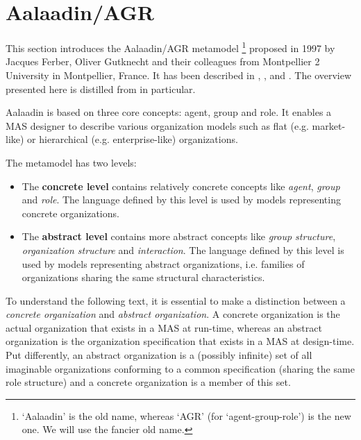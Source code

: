 \section{Aalaadin/AGR}

This section introduces the Aalaadin/AGR metamodel
\footnote{`Aalaadin' is the old name, whereas `AGR' (for `agent-group-role') is the new one. We will use the fancier old name.}
proposed in 1997 by Jacques Ferber, Oliver Gutknecht and their colleagues from Montpellier 2 University in Montpellier, France.
It has been described in \cite{Ferber97}, \cite{Ferber98}, \cite{Ferber00} and \cite{Ferber03}.
The overview presented here is distilled from \cite{Ferber98} in particular.


Aalaadin is based on three core concepts: agent, group and role.
It enables a MAS designer to describe various organization models such as flat (e.g. market-like) or hierarchical (e.g. enterprise-like) organizations.

The metamodel has two levels:
\begin{itemize}
	\item The \textbf{concrete level} contains relatively concrete concepts like \textit{agent}, \textit{group} and \textit{role}.
	The language defined by this level is used by models representing concrete organizations.
	\item The \textbf{abstract level} contains more abstract concepts like \textit{group structure}, \textit{organization structure} and \textit{interaction}. 
	The language defined by this level is used by models representing abstract organizations, i.e. families of organizations sharing the same structural characteristics.
\end{itemize}

To understand the following text, it is essential to make a distinction between a \textit{concrete organization} and \textit{abstract organization}.
A concrete organization is the actual organization that exists in a MAS at run-time, whereas an abstract organization is the organization specification that exists in a MAS at design-time.
Put differently, an abstract organization is a (possibly infinite) set of all imaginable organizations conforming to a common specification (sharing the same role structure) and a concrete organization is a member of this set.

